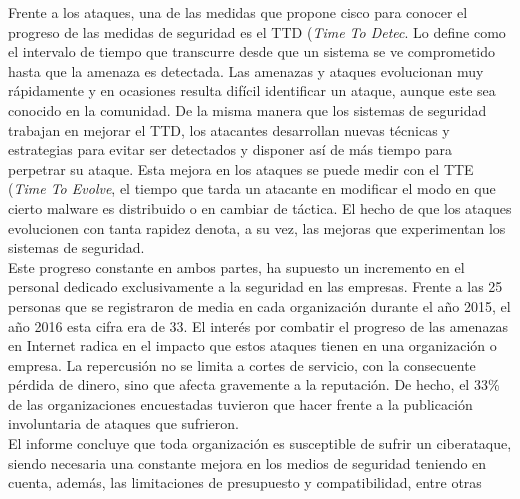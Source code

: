 Frente a los ataques, una de las medidas que propone cisco para conocer el progreso de las medidas de seguridad es el TTD (\textit{Time To Detec}. Lo define como el intervalo de tiempo que transcurre desde que un sistema se ve comprometido hasta que la amenaza es detectada. Las amenazas y ataques evolucionan muy rápidamente y en ocasiones resulta difícil identificar un ataque, aunque este sea conocido en la comunidad. De la misma manera que los sistemas de seguridad trabajan en mejorar el TTD, los atacantes desarrollan nuevas técnicas y estrategias para evitar ser detectados y disponer así de más tiempo  para perpetrar su ataque. Esta mejora en los ataques se puede medir con el TTE (\textit{Time To Evolve}, el tiempo que tarda un atacante en modificar el modo en que cierto malware es distribuido o en cambiar de táctica. El hecho de que los ataques evolucionen con tanta rapidez denota, a su vez, las mejoras que experimentan los sistemas de seguridad.\\
Este progreso constante en ambos partes, ha supuesto un incremento en el personal dedicado exclusivamente a la seguridad en las empresas. Frente a las 25 personas que se registraron de media en cada organización durante el año 2015, el año 2016 esta cifra era de 33. El interés por combatir el progreso de las amenazas en Internet radica en el impacto que estos ataques tienen en una organización o empresa. La repercusión no se limita a cortes de servicio, con la consecuente pérdida de dinero, sino que afecta gravemente a la reputación. De hecho, el 33\% de las organizaciones encuestadas tuvieron que hacer frente a la publicación involuntaria de ataques que sufrieron.\\
El informe concluye que toda organización es susceptible de sufrir un ciberataque, siendo necesaria una constante mejora en los medios de seguridad teniendo en cuenta, además, las limitaciones de presupuesto y compatibilidad, entre otras\cite{ciscoReport}

